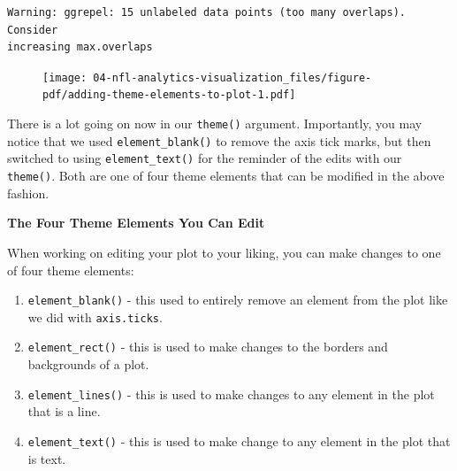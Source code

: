 \documentclass[
  letterpaper,
]{krantz}
\providecommand{\tightlist}{%
  \setlength{\itemsep}{0pt}\setlength{\parskip}{0pt}}\usepackage{longtable,booktabs,array}
\begin{document}
\begin{verbatim}
Warning: ggrepel: 15 unlabeled data points (too many overlaps). Consider
increasing max.overlaps
\end{verbatim}

\begin{figure}[H]

{\centering \texttt{[image: 04-nfl-analytics-visualization\_files/figure-pdf/adding-theme-elements-to-plot-1.pdf]}

}

\end{figure}

There is a lot going on now in our \texttt{theme()} argument.
Importantly, you may notice that we used \texttt{element\_blank()} to
remove the axis tick marks, but then switched to using
\texttt{element\_text()} for the reminder of the edits with our
\texttt{theme()}. Both are one of four theme elements that can be
modified in the above fashion.

\begin{tcolorbox}[enhanced jigsaw, colback=white, leftrule=.75mm, breakable, colframe=quarto-callout-tip-color-frame, bottomtitle=1mm, rightrule=.15mm, left=2mm, opacityback=0, bottomrule=.15mm, arc=.35mm, coltitle=black, colbacktitle=quarto-callout-tip-color!10!white, toptitle=1mm, titlerule=0mm, title=\textcolor{quarto-callout-tip-color}{\faLightbulb}\hspace{0.5em}{Tip}, toprule=.15mm, opacitybacktitle=0.6]

\textbf{The Four Theme Elements You Can Edit}

When working on editing your plot to your liking, you can make changes
to one of four theme elements:

\begin{enumerate}
\def\labelenumi{\arabic{enumi}.}
\tightlist
\item
  \texttt{element\_blank()} - this used to entirely remove an element
  from the plot like we did with \texttt{axis.ticks}.
\item
  \texttt{element\_rect()} - this is used to make changes to the borders
  and backgrounds of a plot.
\item
  \texttt{element\_lines()} - this is used to make changes to any
  element in the plot that is a line.
\item
  \texttt{element\_text()} - this is used to make change to any element
  in the plot that is text.
\end{enumerate}

\end{tcolorbox}
\end{document}
